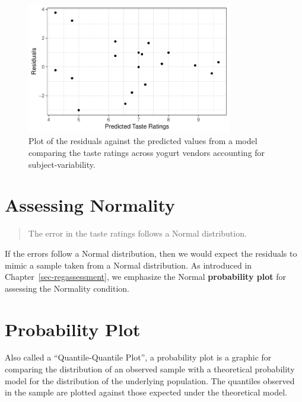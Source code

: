 \documentclass[
  letterpaper,
  DIV=11,
  numbers=noendperiod]{scrreprt}
\theoremstyle{definition}
\theoremstyle{definition}
\theoremstyle{plain}
\theoremstyle{remark}
\begin{document}
\begin{figure}

{\centering \includegraphics[width=0.8\textwidth,height=\textheight]{./images/fig-blockassessment-variance-yogurt-1.pdf}

}

\caption{\label{fig-blockassessment-variance-yogurt}Plot of the
residuals against the predicted values from a model comparing the taste
ratings across yogurt vendors accounting for subject-variability.}

\end{figure}

\hypertarget{assessing-normality-2}{%
\section{Assessing Normality}\label{assessing-normality-2}}

\begin{quote}
The error in the taste ratings follows a Normal distribution.
\end{quote}

If the errors follow a Normal distribution, then we would expect the
residuals to mimic a sample taken from a Normal distribution. As
introduced in Chapter~\ref{sec-regassessment}, we emphasize the Normal
\textbf{probability plot} for assessing the Normality condition.

\hypertarget{probability-plot-2}{%
\section{Probability Plot}\label{probability-plot-2}}

Also called a ``Quantile-Quantile Plot'', a probability plot is a
graphic for comparing the distribution of an observed sample with a
theoretical probability model for the distribution of the underlying
population. The quantiles observed in the sample are plotted against
those expected under the theoretical model.
\end{document}
